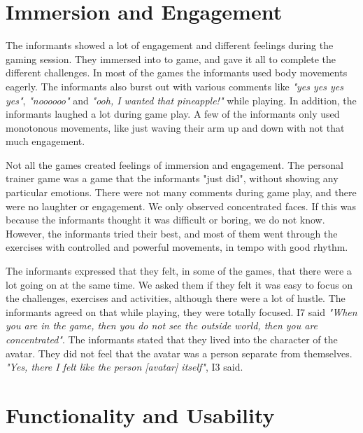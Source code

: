 \section{Immersion and Engagement}
The informants showed a lot of engagement and different feelings during the gaming session. They immersed into to game, and gave it all to complete the different challenges. In most of the games the informants used body movements eagerly. The informants also burst out with various comments like \emph{"yes yes yes yes"}, \emph{"noooooo"} and \emph{"ooh, I wanted that pineapple!"} while playing. In addition, the informants laughed a lot during game play. A few of the informants only used monotonous movements, like just waving their arm up and down with not that much engagement.  

Not all the games created feelings of immersion and engagement. The personal trainer game was a game that the informants "just did", without showing any particular emotions. There were not many comments during game play, and there were no laughter or engagement. We only observed concentrated faces. If this was because the informants thought it was difficult or boring, we do not know. However, the informants tried their best, and most of them went through the exercises with controlled and powerful movements, in tempo with good rhythm.       

The informants expressed that they felt, in some of the games, that there were a lot going on at the same time. We asked them if they felt it was easy to focus on the challenges, exercises and activities, although there were a lot of hustle. The informants agreed on that while playing, they were totally focused. I7 said \emph{"When you are in the game, then you do not see the outside world, then you are concentrated"}. The informants stated that they lived into the character of the avatar. They did not feel that the avatar was a person separate from themselves. \emph{"Yes, there I felt like the person [avatar] itself"}, I3 said. 

\section{Functionality and Usability}
